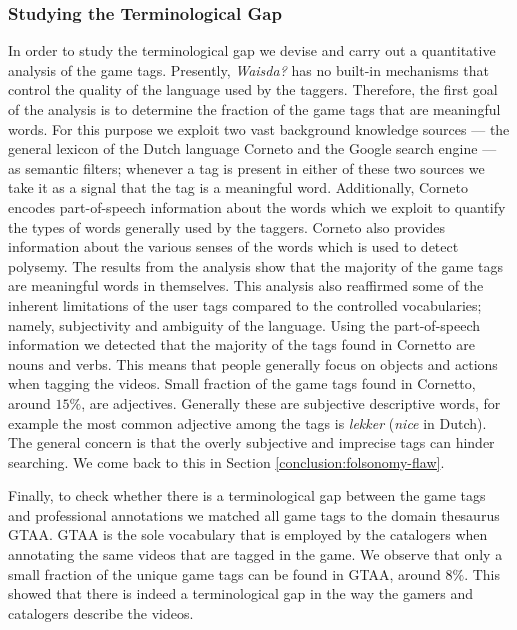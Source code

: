 \subsubsection{Studying the Terminological Gap}
In order to study the terminological gap we devise and carry out a quantitative analysis of the game tags. 
Presently, \textit{Waisda?} has no built-in mechanisms that control the quality of the language used by the taggers. Therefore, the first goal of the analysis is to determine the fraction of the game tags that are meaningful words. For this purpose we exploit two vast background knowledge sources --- the general lexicon of the Dutch language Corneto and the Google search engine --- as semantic filters; whenever a tag is present in either of these two sources we take it as a signal that the tag is a meaningful word. Additionally, Corneto encodes part-of-speech information about the words which we exploit to quantify the types of words generally used by the taggers. Corneto also provides information about the various senses of the words which is used to detect polysemy. 
The results from the analysis show that the majority of the game tags are meaningful words in themselves. This analysis also reaffirmed some of the inherent limitations of the user tags compared to the controlled vocabularies; namely, subjectivity and ambiguity of the language. Using the part-of-speech information we detected that the majority of the tags found in Cornetto are nouns and verbs. This means that people generally focus on objects and actions when tagging the videos. Small fraction of the game tags found in Cornetto, around $15\%$, are adjectives. Generally these are subjective descriptive words, for example the most common adjective among the tags is \textit{lekker} (\textit{nice} in Dutch).
The general concern is that the overly subjective and imprecise tags can hinder searching. We come back to this in Section \ref{conclusion:folsonomy-flaw}.

Finally, to check whether there is a terminological gap between the game tags and professional annotations we matched all game tags to the domain thesaurus GTAA. GTAA is the sole vocabulary that is employed by the catalogers when annotating the same videos that are tagged in the game. We observe that only a small fraction of the unique game tags can be found in GTAA, around $8\%$. This showed that there is indeed a terminological gap in the way the gamers and catalogers describe the videos.

